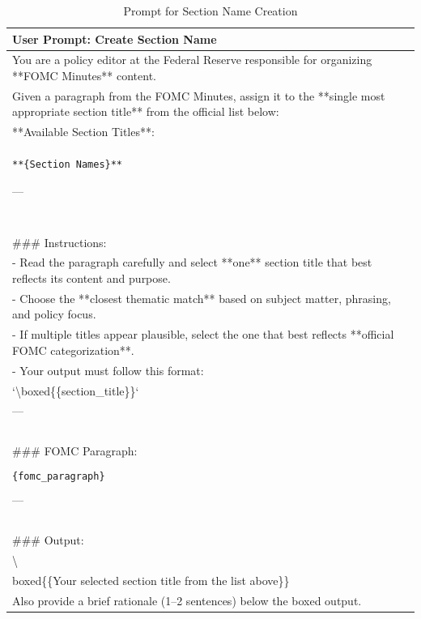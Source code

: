 \begin{table}[htbp]
\centering
\footnotesize
\begin{tabular}{p{}}
\toprule
\textbf{User Prompt: Create Section Name} \\
\hline
You are a policy editor at the Federal Reserve responsible for organizing **FOMC Minutes** content. \\

Given a paragraph from the FOMC Minutes, assign it to the **single most appropriate section title** from the official list below: \\

**Available Section Titles**: \\

\texttt{**\{Section Names\}**}

--- \\
~\\
\#\#\# Instructions: \\

- Read the paragraph carefully and select **one** section title that best reflects its content and purpose. \\
- Choose the **closest thematic match** based on subject matter, phrasing, and policy focus. \\
- If multiple titles appear plausible, select the one that best reflects **official FOMC categorization**.\\
- Your output must follow this format:   \\
  `\textbackslash boxed\{\{section\_title\}\}` \\

--- \\
~\\
\#\#\# FOMC Paragraph: \\
{Paragraph}\\
\texttt{\{fomc\_paragraph\}}  \\
{/Paragraph}\\

--- \\
~\\
\#\#\# Output: \\
\textbackslash \\boxed\{\{Your selected section title from the list above\}\} \\

Also provide a brief rationale (1--2 sentences) below the boxed output. \\

\bottomrule
\end{tabular}
\caption{Prompt for Section Name Creation}
\label{tab:ch2:section_name_prompt}
\end{table}










